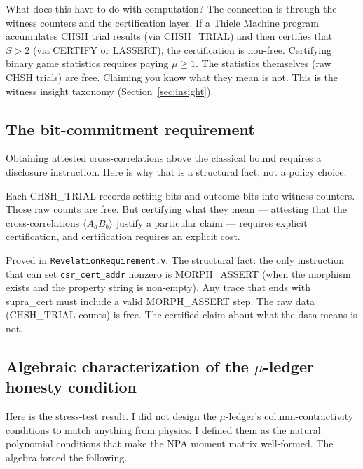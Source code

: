 \documentclass[11pt,a4paper]{article}
\theoremstyle{plain}
\theoremstyle{definition}
\theoremstyle{remark}
\begin{document}
What does this have to do with computation? The connection is through the witness counters and the certification layer. If a Thiele Machine program accumulates CHSH trial results (via CHSH\_TRIAL) and then certifies that $S > 2$ (via CERTIFY or LASSERT), the certification is non-free. Certifying binary game statistics requires paying $\mu \geq 1$. The statistics themselves (raw CHSH trials) are free. Claiming you know what they mean is not. This is the witness insight taxonomy (Section~\ref{sec:insight}).

\subsection{The bit-commitment requirement}

Obtaining attested cross-correlations above the classical bound requires a disclosure instruction. Here is why that is a structural fact, not a policy choice.

Each CHSH\_TRIAL records setting bits and outcome bits into witness counters. Those raw counts are free. But certifying what they mean --- attesting that the cross-correlations $\langle A_a B_b \rangle$ justify a particular claim --- requires explicit certification, and certification requires an explicit cost.

Proved in \texttt{RevelationRequirement.v}. The structural fact: the only instruction that can set \texttt{csr\_cert\_addr} nonzero is MORPH\_ASSERT (when the morphism exists and the property string is non-empty). Any trace that ends with supra\_cert must include a valid MORPH\_ASSERT step. The raw data (CHSH\_TRIAL counts) is free. The certified claim about what the data means is not.

\subsection{Algebraic characterization of the \texorpdfstring{$\mu$}{mu}-ledger honesty condition}

Here is the stress-test result. I did not design the $\mu$-ledger's column-contractivity conditions to match anything from physics. I defined them as the natural polynomial conditions that make the NPA moment matrix well-formed. The algebra forced the following.
\end{document}

